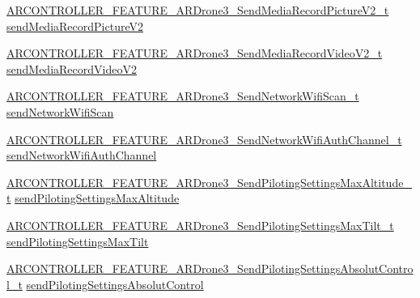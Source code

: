 \begin{DoxyCompactItemize}
\item 
\hyperlink{_a_r_c_o_n_t_r_o_l_l_e_r___feature_8h_a32c8b19e05b9716ea3041d9476735050}{A\+R\+C\+O\+N\+T\+R\+O\+L\+L\+E\+R\+\_\+\+F\+E\+A\+T\+U\+R\+E\+\_\+\+A\+R\+Drone3\+\_\+\+Send\+Media\+Record\+Picture\+V2\+\_\+t} \hyperlink{struct_a_r_c_o_n_t_r_o_l_l_e_r___f_e_a_t_u_r_e___a_r_drone3__t_acf177a580230b274ff919c6ac046e036}{send\+Media\+Record\+Picture\+V2}
\item 
\hyperlink{_a_r_c_o_n_t_r_o_l_l_e_r___feature_8h_a51630e61b38aafc78d4d62476be87b53}{A\+R\+C\+O\+N\+T\+R\+O\+L\+L\+E\+R\+\_\+\+F\+E\+A\+T\+U\+R\+E\+\_\+\+A\+R\+Drone3\+\_\+\+Send\+Media\+Record\+Video\+V2\+\_\+t} \hyperlink{struct_a_r_c_o_n_t_r_o_l_l_e_r___f_e_a_t_u_r_e___a_r_drone3__t_af8cf6c21a1b33ffbecaefe5c602f1ddb}{send\+Media\+Record\+Video\+V2}
\item 
\hyperlink{_a_r_c_o_n_t_r_o_l_l_e_r___feature_8h_ac522fe8b0c8695e4b97c498472403d54}{A\+R\+C\+O\+N\+T\+R\+O\+L\+L\+E\+R\+\_\+\+F\+E\+A\+T\+U\+R\+E\+\_\+\+A\+R\+Drone3\+\_\+\+Send\+Network\+Wifi\+Scan\+\_\+t} \hyperlink{struct_a_r_c_o_n_t_r_o_l_l_e_r___f_e_a_t_u_r_e___a_r_drone3__t_ac6f575c0d9acc26f31452fd5ab8831cf}{send\+Network\+Wifi\+Scan}
\item 
\hyperlink{_a_r_c_o_n_t_r_o_l_l_e_r___feature_8h_a4c1f9cc500865130035f6f24b97d972b}{A\+R\+C\+O\+N\+T\+R\+O\+L\+L\+E\+R\+\_\+\+F\+E\+A\+T\+U\+R\+E\+\_\+\+A\+R\+Drone3\+\_\+\+Send\+Network\+Wifi\+Auth\+Channel\+\_\+t} \hyperlink{struct_a_r_c_o_n_t_r_o_l_l_e_r___f_e_a_t_u_r_e___a_r_drone3__t_ae46276e30d8d044ce3d0e217dcb09170}{send\+Network\+Wifi\+Auth\+Channel}
\item 
\hyperlink{_a_r_c_o_n_t_r_o_l_l_e_r___feature_8h_a53a07b5c58c70199db659aeeef04f0e1}{A\+R\+C\+O\+N\+T\+R\+O\+L\+L\+E\+R\+\_\+\+F\+E\+A\+T\+U\+R\+E\+\_\+\+A\+R\+Drone3\+\_\+\+Send\+Piloting\+Settings\+Max\+Altitude\+\_\+t} \hyperlink{struct_a_r_c_o_n_t_r_o_l_l_e_r___f_e_a_t_u_r_e___a_r_drone3__t_aa5bb498885d365fe93fbc888a3f6cdb4}{send\+Piloting\+Settings\+Max\+Altitude}
\item 
\hyperlink{_a_r_c_o_n_t_r_o_l_l_e_r___feature_8h_a5420ddaa910f284b64378a55aab6bf99}{A\+R\+C\+O\+N\+T\+R\+O\+L\+L\+E\+R\+\_\+\+F\+E\+A\+T\+U\+R\+E\+\_\+\+A\+R\+Drone3\+\_\+\+Send\+Piloting\+Settings\+Max\+Tilt\+\_\+t} \hyperlink{struct_a_r_c_o_n_t_r_o_l_l_e_r___f_e_a_t_u_r_e___a_r_drone3__t_a83613366f5130ac94f1f4667ee866950}{send\+Piloting\+Settings\+Max\+Tilt}
\item 
\hyperlink{_a_r_c_o_n_t_r_o_l_l_e_r___feature_8h_a3829cd47c0cb024cb0be7ec66aff5953}{A\+R\+C\+O\+N\+T\+R\+O\+L\+L\+E\+R\+\_\+\+F\+E\+A\+T\+U\+R\+E\+\_\+\+A\+R\+Drone3\+\_\+\+Send\+Piloting\+Settings\+Absolut\+Control\+\_\+t} \hyperlink{struct_a_r_c_o_n_t_r_o_l_l_e_r___f_e_a_t_u_r_e___a_r_drone3__t_add5ce3cde39fee1ee2b4cbf017cd89e6}{send\+Piloting\+Settings\+Absolut\+Control}

\end{DoxyCompactItemize}
